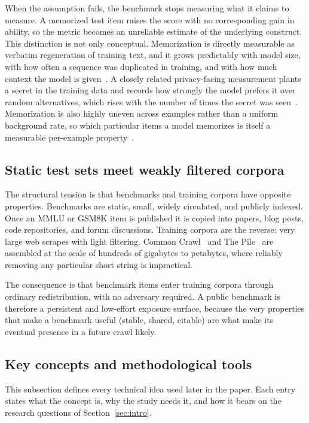 When the assumption fails, the benchmark stops measuring what it claims to measure. A
memorized test item raises the score with no corresponding gain in ability, so the metric
becomes an unreliable estimate of the underlying construct. This distinction is not only
conceptual. Memorization is directly measurable as verbatim regeneration of training
text, and it grows predictably with model size, with how often a sequence was duplicated
in training, and with how much context the model is
given~\citep{carlini2023quantifying}. A closely related privacy-facing measurement plants
a secret in the training data and records how strongly the model prefers it over random
alternatives, which rises with the number of times the secret was
seen~\citep{carlini2019secret}. Memorization is also highly uneven across examples rather
than a uniform background rate, so which particular items a model memorizes is itself a
measurable per-example property~\citep{zhang2023counterfactual}.

\subsection{Static test sets meet weakly filtered corpora}
The structural tension is that benchmarks and training corpora have opposite properties.
Benchmarks are static, small, widely circulated, and publicly indexed. Once an MMLU or
GSM8K item is published it is copied into papers, blog posts, code repositories, and
forum discussions. Training corpora are the reverse: very large web scrapes with light
filtering. Common Crawl~\citep{commoncrawl} and The Pile~\citep{gao2020pile} are
assembled at the scale of hundreds of gigabytes to petabytes, where reliably removing any
particular short string is impractical.

The consequence is that benchmark items enter training corpora through ordinary
redistribution, with no adversary required. A public benchmark is therefore a persistent
and low-effort exposure surface, because the very properties that make a benchmark useful
(stable, shared, citable) are what make its eventual presence in a future crawl likely.

\subsection{Key concepts and methodological tools}
\label{sec:concepts}
This subsection defines every technical idea used later in the paper. Each entry states
what the concept is, why the study needs it, and how it bears on the research questions
of Section~\ref{sec:intro}.


